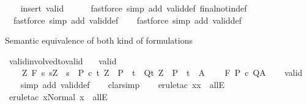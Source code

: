 \begin{isabellebody}
\ \ \isamarkupfalse%
\ {\isacharparenleft}insert\ valid{\isacharparenright}\isanewline
\ \ \isamarkupfalse%
\ \ \ {\isacharparenleft}fastforce\ simp\ add{\isacharcolon}\ valid{\isacharunderscore}def\ final{\isacharunderscore}notin{\isacharunderscore}def{\isacharparenright}\isanewline
\ \ \isamarkupfalse%
\ \ {\isacharparenleft}fastforce\ simp\ add{\isacharcolon}\ valid{\isacharunderscore}def{\isacharparenright}\isanewline
\ \ \isamarkupfalse%
\ {\isacharparenleft}fastforce\ simp\ add{\isacharcolon}\ valid{\isacharunderscore}def{\isacharparenright}\isanewline
\ \ \isamarkupfalse%
%
\endisatagproof
{\isafoldproof}%
%
\isadelimproof
%
\endisadelimproof
%
\begin{isamarkuptext}%
Semantic equivalence of both kind of formulations%
\end{isamarkuptext}\isamarkuptrue%
\isamarkupfalse%
\ valid{\isacharunderscore}involved{\isacharunderscore}to{\isacharunderscore}valid{\isacharcolon}\isanewline
\ \ \ valid{\isacharcolon}\ \isanewline
\ \ \ \ {\isachardoublequoteopen}{\isasymforall}Z{\isachardot}\ {\isasymGamma}{\isasymTurnstile}\isactrlbsub {\isacharslash}F\isactrlesub \ {\isacharbraceleft}s{\isachardot}\ s{\isacharequal}Z\ {\isasymand}\ s\ {\isasymin}\ P{\isacharbraceright}\ c\ {\isacharbraceleft}t{\isachardot}\ Z\ {\isasymin}\ P\ {\isasymlongrightarrow}\ t\ {\isasymin}\ Q{\isacharbraceright}{\isacharcomma}{\isacharbraceleft}t{\isachardot}\ Z\ {\isasymin}\ P\ {\isasymlongrightarrow}\ t\ {\isasymin}\ A{\isacharbraceright}{\isachardoublequoteclose}\isanewline
\ \ \ {\isachardoublequoteopen}{\isasymGamma}\ {\isasymTurnstile}\isactrlbsub {\isacharslash}F\isactrlesub \ P\ c\ Q{\isacharcomma}A{\isachardoublequoteclose}\isanewline
%
\isadelimproof
\ \ %
\endisadelimproof
%
\isatagproof
{}\isamarkupfalse%
\ valid\isanewline
\ \ \isamarkupfalse%
\ {\isacharparenleft}simp\ add{\isacharcolon}\ valid{\isacharunderscore}def{\isacharparenright}\isanewline
\ \ \isamarkupfalse%
\ clarsimp\isanewline
\ \ \isamarkupfalse%
\ {\isacharparenleft}erule{\isacharunderscore}tac\ x{\isacharequal}{\isachardoublequoteopen}x{\isachardoublequoteclose}\ \ allE{\isacharparenright}\isanewline
\ \ \isamarkupfalse%
\ {\isacharparenleft}erule{\isacharunderscore}tac\ x{\isacharequal}{\isachardoublequoteopen}Normal\ x{\isachardoublequoteclose}\ \ allE{\isacharparenright}\isanewline

\end{isabellebody}
